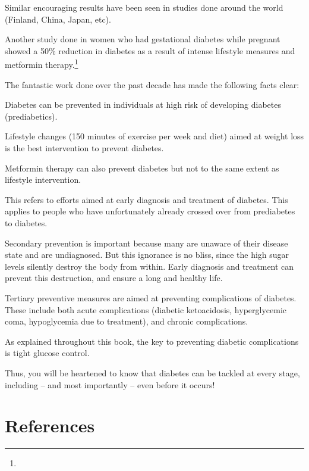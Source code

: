 Similar encouraging results have been seen in studies done around the world (Finland, China, Japan, etc).

Another study done in women who had gestational diabetes while pregnant showed a 50\% reduction in diabetes as a result of intense lifestyle measures and metformin therapy.\footnote{}

The fantastic work done over the past decade has made the following facts clear:

\item Diabetes can be prevented in individuals at high risk of developing diabetes (prediabetics).

 \item Lifestyle changes (150 minutes of exercise per week and diet) aimed at weight loss is the best intervention to prevent diabetes.

 \item Metformin therapy can also prevent diabetes but not to the same extent as lifestyle intervention.

This refers to efforts aimed at early diagnosis and treatment of diabetes. This applies to people who have unfortunately already crossed over from prediabetes to diabetes.

Secondary prevention is important because many are unaware of their disease state and are undiagnosed. But this ignorance is no bliss, since the high sugar levels silently destroy the body from within. Early diagnosis and treatment can prevent this destruction, and ensure a long and healthy life.


Tertiary preventive measures are aimed at preventing complications of diabetes. These include both acute complications (diabetic ketoacidosis, hyperglycemic coma, hypoglycemia due to treatment), and chronic complications.

As explained throughout this book, the key to preventing diabetic complications is tight glucose control.

Thus, you will be heartened to know that diabetes can be tackled at every stage, including – and most importantly – even before it occurs!

\section*{References}

